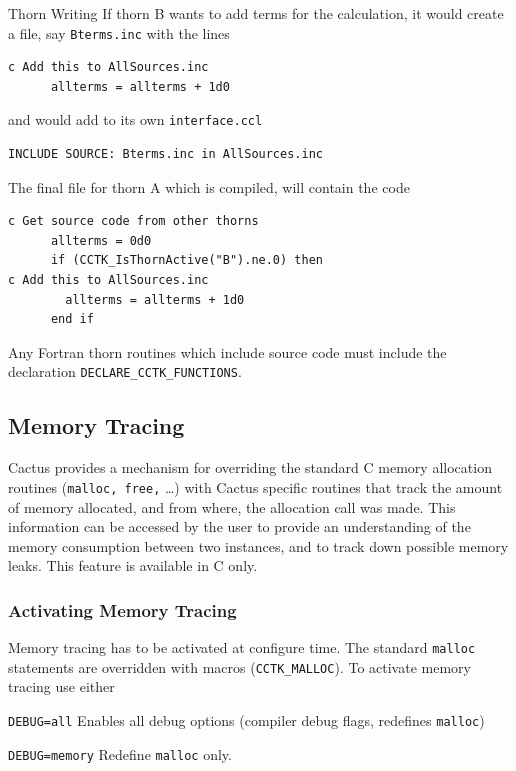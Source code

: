 \begin{cactuspart}{Thorn Writing}
If thorn B wants to add terms for the calculation, it would
create a file, say \texttt{Bterms.inc} with the lines
\begin{verbatim}
c Add this to AllSources.inc
      allterms = allterms + 1d0
\end{verbatim}
and would add to its own \texttt{interface.ccl}

\begin{verbatim}
INCLUDE SOURCE: Bterms.inc in AllSources.inc
\end{verbatim}

The final file for thorn A which is compiled, will contain the code
\begin{verbatim}
c Get source code from other thorns
      allterms = 0d0
      if (CCTK_IsThornActive("B").ne.0) then
c Add this to AllSources.inc
        allterms = allterms + 1d0
      end if
\end{verbatim}

Any Fortran thorn routines which include source code must include
the declaration \texttt{DECLARE\_CCTK\_FUNCTIONS}.


\subsection{Memory Tracing}
\label{sec:metr}

Cactus provides a mechanism for overriding the standard C memory
allocation routines (\texttt{malloc, free,} \ldots) with Cactus specific
routines that track the amount of memory allocated, and from where, the
allocation call was made. This information can be accessed by the user
to provide an understanding of the memory consumption between two
instances, and to track down possible memory leaks. This feature is
available in C only.

\subsubsection{Activating Memory Tracing}
\label{sec:acmetr}

Memory tracing has to be activated at configure time. The standard
\texttt{malloc} statements are overridden with macros (\texttt{CCTK\_MALLOC}).  To
activate memory tracing use either

\begin{Lentry}
\item[\texttt{DEBUG=all}]  Enables all debug options (compiler debug
flags, redefines \texttt{malloc})
\item[\texttt{DEBUG=memory}] Redefine \texttt{malloc} only.
\end{Lentry}


\end{cactuspart}
